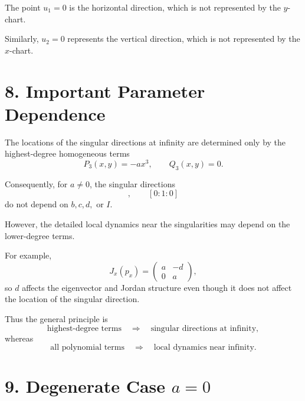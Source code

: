 \documentclass[11pt,a4paper]{article}
\begin{document}
The point $u_1=0$ is the horizontal direction, which is not
represented by the $y$-chart.

Similarly, $u_2=0$ represents the vertical direction, which is not
represented by the $x$-chart.

\section{8. Important Parameter Dependence}

The locations of the singular directions at infinity are determined
only by the highest-degree homogeneous terms
\begin{equation}
P_3(x,y)=-ax^3,
\qquad
Q_3(x,y)=0.
\end{equation}

Consequently, for $a\neq0$, the singular directions
\begin{equation}
[1:0:0],\qquad[0:1:0]
\end{equation}
do not depend on $b,c,d,$ or $I$.

However, the detailed local dynamics near the singularities may
depend on the lower-degree terms.

For example,
\begin{equation}
J_x(p_x)
=
\begin{pmatrix}
a&-d\\
0&a
\end{pmatrix},
\end{equation}
so $d$ affects the eigenvector and Jordan structure even though it
does not affect the location of the singular direction.

Thus the general principle is
\begin{equation}
\boxed{
\text{highest-degree terms}
\quad\Longrightarrow\quad
\text{singular directions at infinity},
}
\tag{46}
\end{equation}
whereas
\begin{equation}
\boxed{
\text{all polynomial terms}
\quad\Longrightarrow\quad
\text{local dynamics near infinity}.
}
\tag{47}
\end{equation}

\section{9. Degenerate Case $a=0$}
\end{document}
